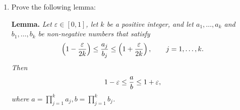 \documentclass[a4paper,12pt]{article}
\begin{document}
\begin{enumerate}
\begin{enumerate}
\end{enumerate}

     \item Prove the following lemma:

    \textbf{Lemma. }
\sl
    Let $\varepsilon\in[0,1]$, let $k$ be a positive integer, and let $a_1,\ldots,a_k$ and $b_1,\ldots,b_k$ be non-negative numbers that satisfy
 $$\left(1-{\varepsilon\over 2k}\right)\leq{a_j\over b_j}\leq \left(1+{\varepsilon\over 2k}\right),\qquad j=1,\ldots,k.$$
 Then
 $$1-\varepsilon\leq {a\over b}\leq 1+\varepsilon,$$
 where $a=\prod_{j=1}^k a_j, b=\prod_{j=1}^k b_j$.
\rm



\end{enumerate}
\end{document}
